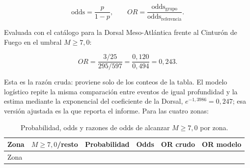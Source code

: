 \documentclass[
  spanish,
  letterpaper,
  DIV=11,
  numbers=noendperiod]{scrartcl}
\begin{document}
\[
\text{odds}=\frac{p}{1-p},
\qquad
OR=\frac{\text{odds}_{\text{grupo}}}{\text{odds}_{\text{referencia}}}.
\]

Evaluada con el catálogo para la Dorsal Meso-Atlántica frente al
Cinturón de Fuego en el umbral \(M \geq 7{,}0\):

\[
OR=\frac{3/25}{295/597}=\frac{0{,}120}{0{,}494}=0{,}243.
\]

Esta es la razón cruda: proviene solo de los conteos de la tabla. El
modelo logístico repite la misma comparación entre eventos de igual
profundidad y la estima mediante la exponencial del coeficiente de la
Dorsal, \(e^{-1{,}3986}=0{,}247\); esa versión ajustada es la que
reporta el informe. Para las cuatro zonas:

\begin{longtable}[]{@{}
  >{\raggedright\arraybackslash}p{}
  >{\raggedleft\arraybackslash}p{}
  >{\raggedleft\arraybackslash}p{}
  >{\raggedleft\arraybackslash}p{}
  >{\raggedleft\arraybackslash}p{}
  >{\raggedleft\arraybackslash}p{}@{}}
\caption{Probabilidad, odds y razones de odds de alcanzar
\(M \geq 7{,}0\) por zona.}\label{tbl-odds-zonas}\tabularnewline
\toprule\noalign{}
\begin{minipage}[b]{\linewidth}\raggedright
Zona
\end{minipage} & \begin{minipage}[b]{\linewidth}\raggedleft
\(M{\geq}7{,}0\)/resto
\end{minipage} & \begin{minipage}[b]{\linewidth}\raggedleft
Probabilidad
\end{minipage} & \begin{minipage}[b]{\linewidth}\raggedleft
Odds
\end{minipage} & \begin{minipage}[b]{\linewidth}\raggedleft
OR crudo
\end{minipage} & \begin{minipage}[b]{\linewidth}\raggedleft
OR modelo
\end{minipage} \\
\midrule\noalign{}
\endfirsthead
\toprule\noalign{}
\begin{minipage}[b]{\linewidth}\raggedright
Zona
\end{minipage} & \begin{minipage}[b]{\linewidth}\raggedleft

\end{minipage}
\end{longtable}
\end{document}
